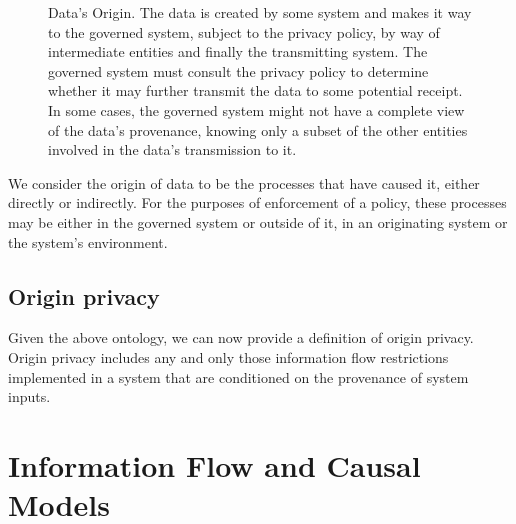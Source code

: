 \documentclass[../thesis.tex]{subfiles}
\begin{document}
\begin{figure*}
\begin{center}
\end{center}
\caption{Data's Origin.  The data is created by some system and makes it way to the governed system, subject to the privacy policy, by way of intermediate entities and finally the transmitting system.  The governed system must consult the privacy policy to determine whether it may further transmit the data to some potential receipt.  In some cases, the governed system might not have a complete view of the data's provenance, knowing only a subset of the other entities involved in the data's transmission to it.}
\label{fig:provenance}
\end{figure*}
\fi

We consider the origin of data to be the processes
that have caused it, either directly or indirectly.
For the purposes of enforcement of a policy, these processes
may be either in the governed system or outside of it,
in an originating system or the system's environment.

\subsection{Origin privacy}

Given the above ontology, we can now provide a definition
of origin privacy.
Origin privacy includes any and only those information
flow restrictions implemented in a system that are conditioned
on the provenance of system inputs.
 
\section{Information Flow and Causal Models}
\label{sec:causality}
\end{document}
